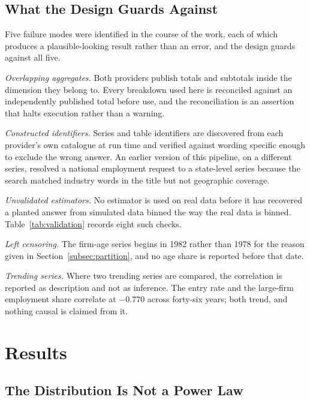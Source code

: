 \documentclass[jrfm,article,submit,pdftex,moreauthors]{Definitions/mdpi}
\begin{document}
\subsection{What the Design Guards Against}
\label{subsec:guards}

Five failure modes were identified in the course of the work, each of which produces a
plausible-looking result rather than an error, and the design guards against all five.

\emph{Overlapping aggregates.} Both providers publish totals and subtotals inside the
dimension they belong to. Every breakdown used here is reconciled against an independently
published total before use, and the reconciliation is an assertion that halts execution
rather than a warning.

\emph{Constructed identifiers.} Series and table identifiers are discovered from each
provider's own catalogue at run time and verified against wording specific enough to exclude
the wrong answer. An earlier version of this pipeline, on a different series, resolved a
national employment request to a state-level series because the search matched industry
words in the title but not geographic coverage.

\emph{Unvalidated estimators.} No estimator is used on real data before it has recovered a
planted answer from simulated data binned the way the real data is binned.
Table~\ref{tab:validation} records eight such checks.

\emph{Left censoring.} The firm-age series begins in 1982 rather than 1978 for the reason
given in Section~\ref{subsec:partition}, and no age share is reported before that date.

\emph{Trending series.} Where two trending series are compared, the correlation is reported
as description and not as inference. The entry rate and the large-firm employment share
correlate at $-0.770$ across forty-six years; both trend, and nothing causal is claimed from
it.

\section{Results}
\label{sec:results}

\subsection{The Distribution Is Not a Power Law}
\label{subsec:c1}
\end{document}
